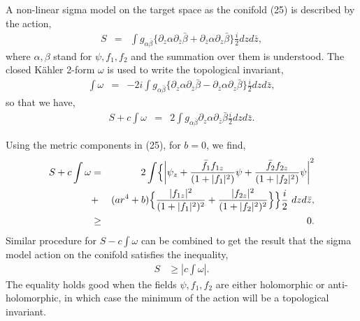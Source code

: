 \documentclass[a4paper,12pt]{article}
\begin{document}
A non-linear sigma model on the target
space as the conifold (25) is described by the action,
\begin{eqnarray}
S&=& \int g_{\alpha \bar{\beta}} \{ {\partial}_z{\alpha} {\partial}_{\bar{z}}
{\bar{\beta}}+{\partial}_{\bar{z}}{\alpha}{\partial}_{z}{\bar{\beta}}\} 
\frac{i}{2} dz d\bar{z},
\end{eqnarray}
where $\alpha, \beta$ stand for $\psi, f_1, f_2$ and the summation over them
is understood. The closed K\"{a}hler 2-form $\omega$ is used to write the 
topological invariant,
\begin{eqnarray}
\int \omega &=& -2i \int g_{\alpha \bar{\beta}} \{ {\partial}_z \alpha 
{\partial}_{\bar{z}}\bar{\beta} - {\partial}_{\bar{z}}\alpha {\partial}_z
\bar{\beta}\} \frac{i}{2} dz d\bar{z},
\end{eqnarray}
so that we have,
\begin{eqnarray}
S+c\int \omega &=& 2\int g_{\alpha \bar{\beta}}{\partial}_z\alpha {\partial}
_{\bar{z}}\bar{\beta} \frac{i}{2} dz d\bar{z}.
\end{eqnarray}

\vspace{0.5cm}

Using the metric components in (25), for $b=0$, we find,
\begin{eqnarray}
S+c\int \omega& =& 2\int \Bigl\{ \left | {\psi}_z+\frac{{\bar{f}}_1f_{1z}}{(1+
|f_1|^2)}\psi + \frac{{\bar{f}}_2f_{2z}}{(1+|f_2|^2)}\psi\right |^2 \nonumber \\
&+&(ar^4+b)\Bigl\{ \frac{|f_{1z}|^2}{(1+|f_1|^2)^2}+\frac{|f_{2z}|^2}{
(1+|f_2|^2)^2}\Bigr\} \Bigr\}\frac{i}{2}\ dz d\bar{z}, \nonumber \\
&\geq & 0.
\end{eqnarray}
Similar procedure for $S-c\int \omega$ can be combined to get the result that 
the sigma model action on the conifold satisfies the inequality,
\begin{eqnarray}
S&\geq |c\int \omega |.
\end{eqnarray}
The equality holds good when the fields $\psi, f_1, f_2$ are either 
holomorphic  or anti-holomorphic, 
 in which case the minimum of the action will be 
a topological invariant.  
 
\vspace{0.5cm}
\end{document}
